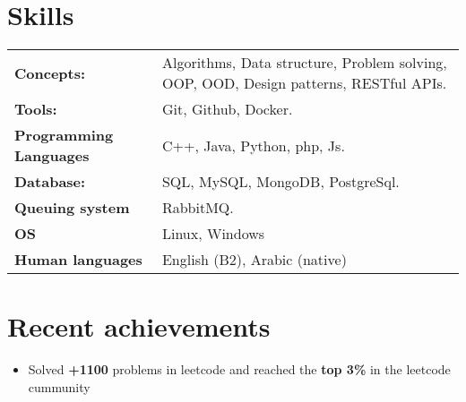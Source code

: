 \documentclass[a4,10pt]{article}
\newenvironment{zitemize}{
\begin{itemize}\itemsep0pt \parskip0pt \parsep1pt}
{\end{itemize}\vspace{-0.5cm}}
\newcommand{\hskills}[1]{
\textbf{\bfseries #1} }
\begin{document}
\section{Skills}
\begin{tabular}{p{14em} p{48em}}
\hskills{Concepts:} &  Algorithms, Data structure, Problem solving, OOP, OOD, Design
patterns, RESTful APIs. \\
\hskills{Tools:} & Git, Github, Docker.  \\
\hskills{Programming Languages} & C++, Java, Python, php, Js. \\
\hskills{Database:} & SQL, MySQL, MongoDB, PostgreSql. \\
\hskills{Queuing system} & RabbitMQ. \\
\hskills{OS} & Linux, Windows \\
\hskills{Human languages} & English (B2), Arabic (native) \\
\end{tabular}
\vspace{-0.2cm}


\section{Recent achievements} 
\renewcommand\refname{\vskip -1.5em}
\begin{zitemize}
    \item Solved \textbf{+1100} problems in leetcode and reached the \textbf{top 3\%} in the
    leetcode cummunity
\end{zitemize}
\printbibliography[heading=none]
\vspace{-0.4cm}


\end{document}
